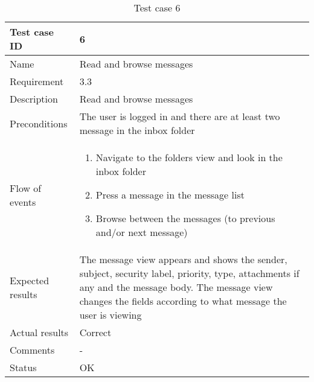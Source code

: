 		\begin{table}
			\begin{tabular}{l|p{10cm}}
				Test case ID & 6 \\ \hline
				Name & Read and browse messages\\ \hline
				Requirement & 3.3\\ \hline
				Description & Read and browse messages\\ \hline
				Preconditions & The user is logged in and there are at least two message in the inbox folder\\ \hline
				Flow of events & 
					\begin{enumerate}
						\item{}Navigate to the folders view and look in the inbox folder
						\item{}Press a message in the message list
						\item{}Browse between the messages (to previous and/or next message)
					\end{enumerate} \\ \hline
				Expected results & The message view appears and shows the sender, subject, security label, priority, 							type, attachments if any and the message body. The message view changes the fields according to 						what message the user is viewing \\ \hline
				Actual results & Correct\\ \hline
				Comments & -\\ \hline
				Status & OK\\ \hline
			\end{tabular}
			\caption{Test case 6} \label{tab:case6}
		\end{table}

